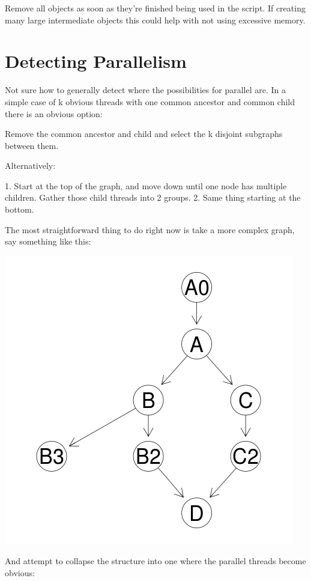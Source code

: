 \documentclass[12pt]{article}
\begin{document}
Remove all objects as soon as they're finished being used in the script. If
creating many large intermediate objects this could help with not using
excessive memory.

\section{Detecting Parallelism}

Not sure how to generally detect where the possibilities for
parallel are. In a simple case of k obvious threads with one common
ancestor and common child there is an obvious option:

Remove the common ancestor and child and select the k disjoint subgraphs
between them.

Alternatively:

1. Start at the top of the graph, and move down until one node has
multiple children. Gather those child threads into 2 groups.
2. Same thing starting at the bottom.

The most straightforward thing to do right now is take a more complex
graph, say something like this:

\centerline{\includegraphics{../codedepends/larger_graph.png}}


And attempt to collapse the structure into one where the parallel threads
become obvious:
\end{document}
